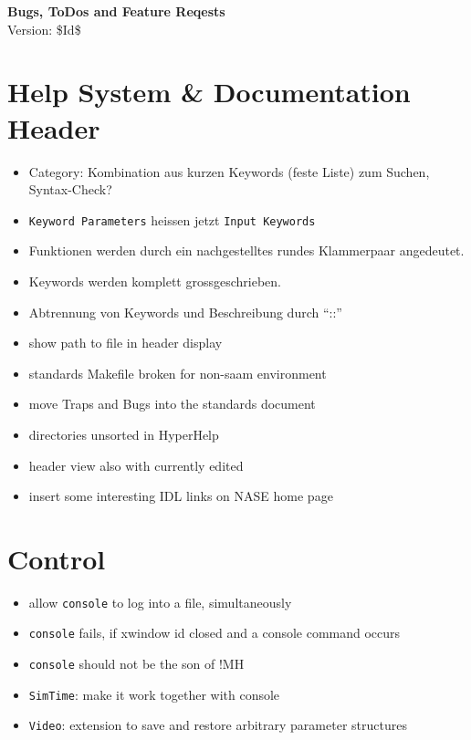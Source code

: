 \documentclass[12pt]{article}
\begin{document}
\begin{center}
{\Huge\textbf{Bugs, ToDos and Feature Reqests}}\\[2cm]
Version: \$Id$ $\$ 
\end{center}

\section{Help System \& Documentation Header} 

\begin{itemize}
\item Category: Kombination aus kurzen Keywords (feste Liste) zum Suchen, Syntax-Check?
\item \texttt{Keyword Parameters} heissen jetzt \texttt{Input Keywords}
\item Funktionen werden durch ein nachgestelltes rundes Klammerpaar angedeutet.
\item Keywords werden komplett grossgeschrieben. 
\item Abtrennung von Keywords und Beschreibung durch ``::''
\item show path to file in header display
\item standards Makefile broken for non-saam environment
\item move Traps and Bugs into the standards document
\item directories unsorted in HyperHelp
\item header view also with currently edited 
\item insert some interesting IDL links on NASE home page
\end{itemize}



\section{Control}
\begin{itemize}
\item allow \texttt{console} to log into a file, simultaneously
\item \texttt{console} fails, if xwindow id closed and a console command occurs
\item \texttt{console} should not be the son of !MH
\item \texttt{SimTime}: make it work together with console
\item \texttt{Video}: extension to save and restore arbitrary parameter structures
\end{itemize}
\end{document}

